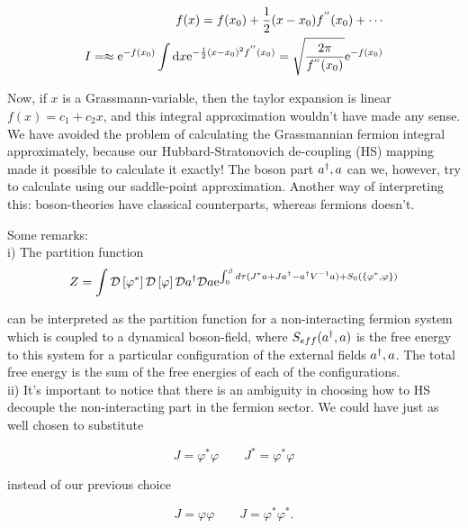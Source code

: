 \begin{align*}
    f(x) = f(x_0) + \frac{1}{2}(x-x_0)f^{''}(x_0) + \cdots \\ 
    I = \approx \mathrm{e}^{-f(x_0)}\int \dd x \mathrm{e}^{-\frac{1}{2}(x - x_0)^{2} f^{''}(x_0)} = \sqrt{\frac{2\pi}{f^{''}(x_0)}}\mathrm{e}^{-f(x_0)}
\end{align*}

Now, if $x$ is a Grassmann-variable, then the taylor expansion is linear $f(x) = c_1 + c_2 x$, and this integral approximation wouldn't have made any sense. We have avoided the problem of calculating the Grassmannian fermion integral approximately, because our Hubbard-Stratonovich de-coupling (HS) mapping made it possible to calculate it exactly! The boson part $a^{\dagger}, a$ can we, however, try to calculate using our saddle-point approximation. Another way of interpreting this: boson-theories have classical counterparts, whereas fermions doesn't. 

Some remarks: \\

i) The partition function \\

\begin{equation*}
    Z = \int \mathcal{D} \left[ \varphi^*\right] \mathcal{D} \left[\varphi\right]\mathcal{D} a^{\dagger} \mathcal{D} a \mathrm{e}^{\int_0^\beta d\tau (J^* a + J a^{\dagger} - a^{\dagger} V^{-1}a) + S_0(\{\varphi^*,\varphi \})}
\end{equation*}

can be interpreted as the partition function for a non-interacting fermion system which is coupled to a dynamical boson-field, where $S_{eff}(a^{\dagger}, a)$ is the free energy to this system for a particular configuration of the external fields $a^{\dagger},a$. The total free energy is the sum of the free energies of each of the configurations. \\ 

ii) It's important to notice that there is an ambiguity in choosing how to HS decouple the non-interacting part in the fermion sector. We could have just as well chosen to substitute 

\begin{equation*}
    J = \varphi^* \varphi \quad \quad J^* = \varphi^* \varphi
\end{equation*}

instead of our previous choice 

\begin{equation*}
    J = \varphi \varphi \quad \quad J = \varphi^* \varphi^*. 
\end{equation*}

